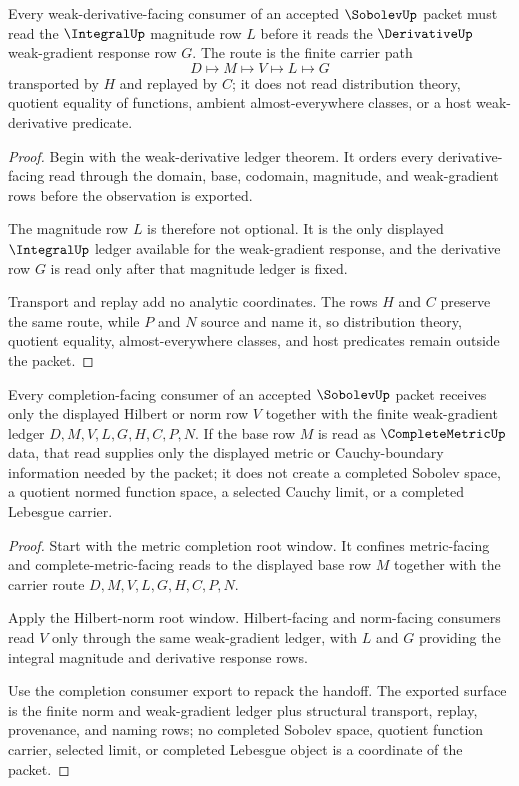 \begin{theorem}
\label{thm:sobolev-weak-derivative-route}
Every weak-derivative-facing consumer of an accepted $\SobolevUp$ packet must read the $\IntegralUp$ magnitude row $L$ before it reads the $\DerivativeUp$ weak-gradient response row $G$. The route is the finite carrier path
$$
D \longmapsto M \longmapsto V \longmapsto L \longmapsto G
$$
transported by $H$ and replayed by $C$; it does not read distribution theory, quotient equality of functions, ambient almost-everywhere classes, or a host weak-derivative predicate.
\end{theorem}
\begin{proof}
Begin with the weak-derivative ledger theorem. It orders every derivative-facing read through the domain, base, codomain, magnitude, and weak-gradient rows before the observation is exported.

The magnitude row $L$ is therefore not optional. It is the only displayed $\IntegralUp$ ledger available for the weak-gradient response, and the derivative row $G$ is read only after that magnitude ledger is fixed.

Transport and replay add no analytic coordinates. The rows $H$ and $C$ preserve the same route, while $P$ and $N$ source and name it, so distribution theory, quotient equality, almost-everywhere classes, and host predicates remain outside the packet.
\end{proof}

\begin{theorem}
\label{thm:sobolev-completion-norm-handoff}
Every completion-facing consumer of an accepted $\SobolevUp$ packet receives only the displayed Hilbert or norm row $V$ together with the finite weak-gradient ledger $D,M,V,L,G,H,C,P,N$. If the base row $M$ is read as $\CompleteMetricUp$ data, that read supplies only the displayed metric or Cauchy-boundary information needed by the packet; it does not create a completed Sobolev space, a quotient normed function space, a selected Cauchy limit, or a completed Lebesgue carrier.
\end{theorem}
\begin{proof}
Start with the metric completion root window. It confines metric-facing and complete-metric-facing reads to the displayed base row $M$ together with the carrier route $D,M,V,L,G,H,C,P,N$.

Apply the Hilbert-norm root window. Hilbert-facing and norm-facing consumers read $V$ only through the same weak-gradient ledger, with $L$ and $G$ providing the integral magnitude and derivative response rows.

Use the completion consumer export to repack the handoff. The exported surface is the finite norm and weak-gradient ledger plus structural transport, replay, provenance, and naming rows; no completed Sobolev space, quotient function carrier, selected limit, or completed Lebesgue object is a coordinate of the packet.
\end{proof}

